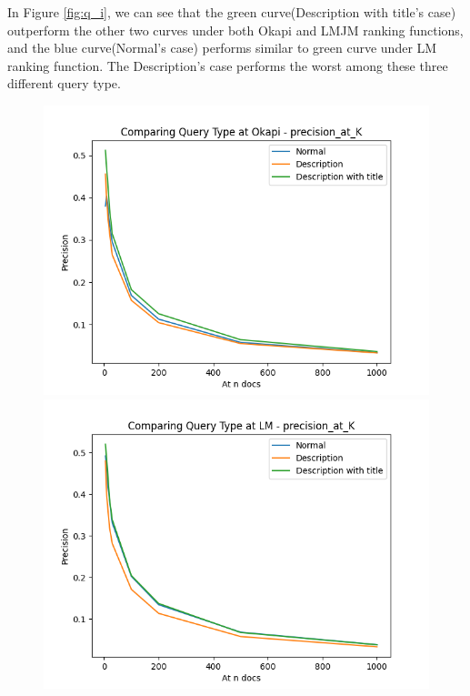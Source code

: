 \documentclass[10pt, a4paper]{article}
\begin{document}
In Figure \ref{fig:q_i}, we can see that the green curve(Description with title's case) outperform the other two curves under both Okapi and LMJM ranking functions, and the blue curve(Normal's case) performs similar to green curve under LM ranking function. The Description's case performs the worst among these three different query type.

\begin{figure}[h!]
\centering
\includegraphics[scale=0.3]{compare query/Comparing Query Type at Okapi - precision_at_K-pak.png}
\includegraphics[scale=0.3]{compare query/Comparing Query Type at LM - precision_at_K-pak.png}

\end{figure}
\end{document}
